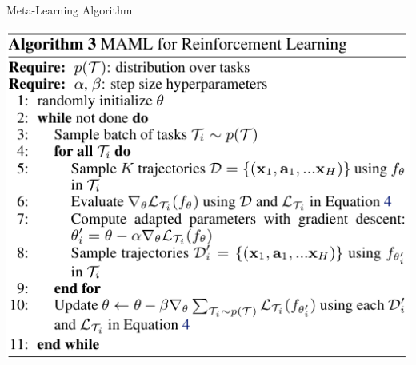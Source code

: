 \documentclass[compress]{beamer}
\begin{document}
\begin{frame}[allowframebreaks]{Meta-Learning Algorithm}
\begin{center}
        \includegraphics[height=.6\textheight]{reinforcement}
    \end{center}
\end{frame}
\end{document}
